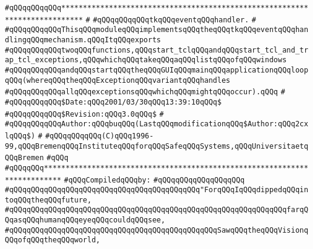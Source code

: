\label{src/lib/tk/src/event-loop.api}
\verb|#qQQqqQQqqQQq***************************************************************************|\newline
\verb|#|\newline
\verb|#qQQqqQQqqQQqtkqQQqeventqQQqhandler.|\newline
\verb|#|\newline
\verb|#qQQqqQQqqQQqThisqQQqmoduleqQQqimplementsqQQqtheqQQqtkqQQqeventqQQqhandlingqQQqmechanism.qQQqItqQQqexports|\newline
\verb|#qQQqqQQqqQQqtwoqQQqfunctions,qQQqstart_tclqQQqandqQQqstart_tcl_and_trap_tcl_exceptions,qQQqwhichqQQqtakeqQQqaqQQqlistqQQqofqQQqwindows|\newline
\verb|#qQQqqQQqqQQqandqQQqstartqQQqtheqQQqGUIqQQqmainqQQqapplicationqQQqloopqQQq(whereqQQqtheqQQqExceptionqQQqvariantqQQqhandles|\newline
\verb|#qQQqqQQqqQQqallqQQqexceptionsqQQqwhichqQQqmightqQQqoccur).qQQq|\newline
\verb|#|\newline
\verb|#qQQqqQQqqQQq$Date:qQQq2001/03/30qQQq13:39:10qQQq$|\newline
\verb|#qQQqqQQqqQQq$Revision:qQQq3.0qQQq$|\newline
\verb|#|\newline
\verb|#qQQqqQQqqQQqAuthor:qQQqbuqQQq(LastqQQqmodificationqQQq$Author:qQQq2cxlqQQq$)|\newline
\verb|#|\newline
\verb|#qQQqqQQqqQQq(C)qQQq1996-99,qQQqBremenqQQqInstituteqQQqforqQQqSafeqQQqSystems,qQQqUniversitaetqQQqBremen|\newline
\verb|#qQQq|\newline
\verb|#qQQqqQQq**************************************************************************|\newline
\newline
\verb|#qQQqCompiledqQQqby:|\newline
\verb|#qQQqqQQqqQQqqQQqqQQq|\newline
\newline
\verb|#qQQqqQQqqQQqqQQqqQQqqQQqqQQqqQQqqQQqqQQqqQQq"ForqQQqIqQQqdippedqQQqintoqQQqtheqQQqfuture,|\newline
\verb|#qQQqqQQqqQQqqQQqqQQqqQQqqQQqqQQqqQQqqQQqqQQqqQQqqQQqqQQqqQQqqQQqfarqQQqasqQQqhumanqQQqeyeqQQqcouldqQQqsee,|\newline
\verb|#qQQqqQQqqQQqqQQqqQQqqQQqqQQqqQQqqQQqqQQqqQQqqQQqSawqQQqtheqQQqVisionqQQqofqQQqtheqQQqworld,|\newline
